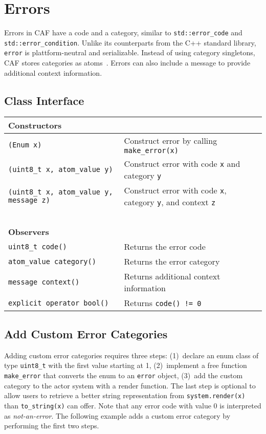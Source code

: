 \section{Errors}
\label{error}

Errors in CAF have a code and a category, similar to
\lstinline^std::error_code^ and \lstinline^std::error_condition^. Unlike its
counterparts from the C++ standard library, \lstinline^error^ is
plattform-neutral and serializable. Instead of using category singletons, CAF
stores categories as atoms~. Errors can also include a message to
provide additional context information.

\subsection{Class Interface}

\begin{center}
\begin{tabular}{ll}
  \textbf{Constructors} & ~ \\
  \hline
  \lstinline^(Enum x)^ & Construct error by calling \lstinline^make_error(x)^ \\
  \hline
  \lstinline^(uint8_t x, atom_value y)^ & Construct error with code \lstinline^x^ and category \lstinline^y^ \\
  \hline
  \lstinline^(uint8_t x, atom_value y, message z)^ & Construct error with code \lstinline^x^, category \lstinline^y^, and context \lstinline^z^ \\
  \hline
  ~ & ~ \\ \textbf{Observers} & ~ \\
  \hline
  \lstinline^uint8_t code()^ & Returns the error code \\
  \hline
  \lstinline^atom_value category()^ & Returns the error category \\
  \hline
  \lstinline^message context()^ & Returns additional context information \\
  \hline
  \lstinline^explicit operator bool()^ & Returns \lstinline^code() != 0^ \\
  \hline
\end{tabular}
\end{center}

\subsection{Add Custom Error Categories}
\label{custom-error}

Adding custom error categories requires three steps: (1)~declare an enum class
of type \lstinline^uint8_t^ with the first value starting at 1, (2)~implement a
free function \lstinline^make_error^ that converts the enum to an
\lstinline^error^ object, (3)~add the custom category to the actor system with
a render function. The last step is optional to allow users to retrieve a
better string representation from \lstinline^system.render(x)^ than
\lstinline^to_string(x)^ can offer. Note that any error code with value 0 is
interpreted as \emph{not-an-error}. The following example adds a custom error
category by performing the first two steps.

